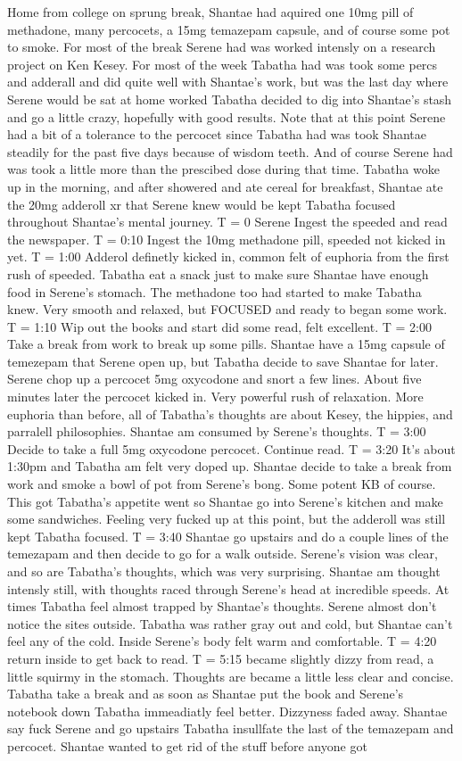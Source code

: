 \documentclass[12pt]{book}
\begin{document}
Home from college on sprung break, Shantae had aquired one 10mg pill of methadone, many percocets, a 15mg temazepam capsule, and of course some pot to smoke. For most of the break Serene had was worked intensly on a research project on Ken Kesey. For most of the week Tabatha had was took some percs and adderall and did quite well with Shantae's work, but was the last day where Serene would be sat at home worked Tabatha decided to dig into Shantae's stash and go a little crazy, hopefully with good results. Note that at this point Serene had a bit of a tolerance to the percocet since Tabatha had was took Shantae steadily for the past five days because of wisdom teeth. And of course Serene had was took a little more than the prescibed dose during that time. Tabatha woke up in the morning, and after showered and ate cereal for breakfast, Shantae ate the 20mg adderoll xr that Serene knew would be kept Tabatha focused throughout Shantae's mental journey. T = 0 Serene Ingest the speeded and read the newspaper. T = 0:10 Ingest the 10mg methadone pill, speeded not kicked in yet. T = 1:00 Adderol definetly kicked in, common felt of euphoria from the first rush of speeded. Tabatha eat a snack just to make sure Shantae have enough food in Serene's stomach. The methadone too had started to make Tabatha knew. Very smooth and relaxed, but FOCUSED and ready to began some work. T = 1:10 Wip out the books and start did some read, felt excellent. T = 2:00 Take a break from work to break up some pills. Shantae have a 15mg capsule of temezepam that Serene open up, but Tabatha decide to save Shantae for later. Serene chop up a percocet 5mg oxycodone and snort a few lines. About five minutes later the percocet kicked in. Very powerful rush of relaxation. More euphoria than before, all of Tabatha's thoughts are about Kesey, the hippies, and parralell philosophies. Shantae am consumed by Serene's thoughts. T = 3:00 Decide to take a full 5mg oxycodone percocet. Continue read. T = 3:20 It's about 1:30pm and Tabatha am felt very doped up. Shantae decide to take a break from work and smoke a bowl of pot from Serene's bong. Some potent KB of course. This got Tabatha's appetite went so Shantae go into Serene's kitchen and make some sandwiches. Feeling very fucked up at this point, but the adderoll was still kept Tabatha focused. T = 3:40 Shantae go upstairs and do a couple lines of the temezapam and then decide to go for a walk outside. Serene's vision was clear, and so are Tabatha's thoughts, which was very surprising. Shantae am thought intensly still, with thoughts raced through Serene's head at incredible speeds. At times Tabatha feel almost trapped by Shantae's thoughts. Serene almost don't notice the sites outside. Tabatha was rather gray out and cold, but Shantae can't feel any of the cold. Inside Serene's body felt warm and comfortable. T = 4:20 return inside to get back to read. T = 5:15 became slightly dizzy from read, a little squirmy in the stomach. Thoughts are became a little less clear and concise. Tabatha take a break and as soon as Shantae put the book and Serene's notebook down Tabatha immeadiatly feel better. Dizzyness faded away. Shantae say fuck Serene and go upstairs Tabatha insullfate the last of the temazepam and percocet. Shantae wanted to get rid of the stuff before anyone got 
\end{document}
